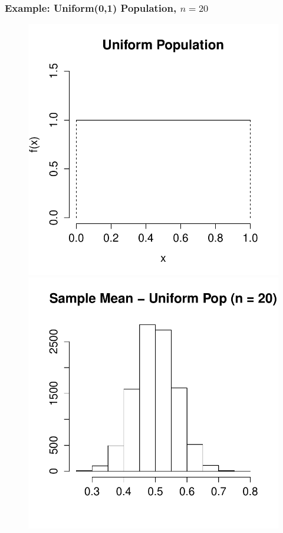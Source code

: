 \documentclass[handout]{beamer}
\begin{document}
\begin{frame}
\frametitle{Example: Uniform(0,1) Population, $n = 20$}
\begin{figure}
\centering
\includegraphics[scale = 0.4]{./images/uniform_pdf}
\includegraphics[scale = 0.4]{./images/xbar_uniform}
\end{figure}
\end{frame}
\end{document}
